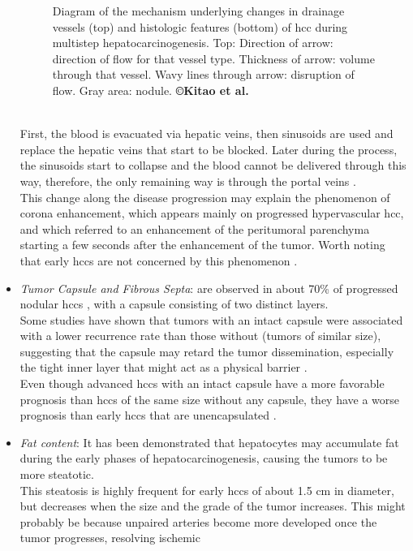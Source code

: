 \begin{itemize}
\begin{figure}[th!]
\caption{Diagram of the mechanism underlying changes in drainage vessels (top) and histologic features (bottom) of \ac{hcc} during multistep hepatocarcinogenesis. Top: Direction of arrow: direction of flow for that vessel type. Thickness of arrow: volume through that vessel. Wavy lines through arrow: disruption of flow. Gray area: nodule. \textbf{©Kitao et al. \cite{Kitao2009}}}
\label{Kitao2009_Fig10}
\end{figure} \\
First, the blood is evacuated via hepatic veins, then sinusoids are used
and replace the hepatic veins that start to be blocked. Later during the
process, the sinusoids start to collapse and the blood cannot be
delivered through this way, therefore, the only remaining way is through
the portal veins \cite{Ueda1998,Kitao2009}. \\
This change along the disease progression may explain the phenomenon of
corona enhancement, which appears mainly on progressed hypervascular
\ac{hcc}, and which referred to an enhancement of the peritumoral
parenchyma starting a few seconds after the enhancement of the tumor.
Worth noting that early \ac{hcc}s are not concerned by this phenomenon
\cite{Matsui2011}.
\item \emph{Tumor Capsule and Fibrous Septa}: are observed in about 70\% of
  progressed nodular \ac{hcc}s \cite{Kojiro2005},
  with a capsule consisting of two distinct layers.\\
  Some studies have shown that tumors with an intact capsule were
  associated with a lower recurrence rate than those without (tumors of
  similar size), suggesting that the capsule may retard the tumor
  dissemination, especially the tight inner layer that might act as a
  physical barrier \cite{Ng1992}.\\
  Even though advanced \ac{hcc}s with an intact capsule have a more
  favorable prognosis than \ac{hcc}s of the same size without any
  capsule, they have a worse prognosis than early \ac{hcc}s that are
  unencapsulated \cite{Iguchi2009}.
\item \emph{Fat content}: It has been demonstrated that hepatocytes may
  accumulate fat during the early phases of hepatocarcinogenesis,
  causing the tumors to be more steatotic.\\
  This steatosis is highly frequent for early \ac{hcc}s of about 1.5
  cm in diameter, but decreases when the size and the grade of the tumor
  increases. This might probably be because unpaired arteries become
  more developed once the tumor progresses, resolving ischemic

\end{itemize}
